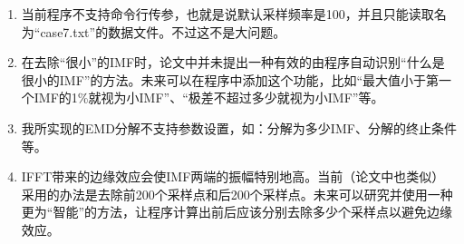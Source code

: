 \documentclass[cs4size,a4paper]{ctexart}
\numberwithin{equation}{section}
\numberwithin{table}{section}
\numberwithin{figure}{section}
\begin{document}
\begin{enumerate}
\item 当前程序不支持命令行传参，也就是说默认采样频率是100，并且只能读取名为“case7.txt”的数据文件。不过这不是大问题。
\item 在去除“很小”的IMF时，论文中并未提出一种有效的由程序自动识别“什么是很小的IMF”的方法。未来可以在程序中添加这个功能，比如“最大值小于第一个IMF的1\%就视为小IMF”、“极差不超过多少就视为小IMF”等。
\item 我所实现的EMD分解不支持参数设置，如：分解为多少IMF、分解的终止条件等。
\item IFFT带来的边缘效应会使IMF两端的振幅特别地高。当前（论文中也类似）采用的办法是去除前200个采样点和后200个采样点。未来可以研究并使用一种更为“智能”的方法，让程序计算出前后应该分别去除多少个采样点以避免边缘效应。
\end{enumerate}








%
                         
\end{document}
